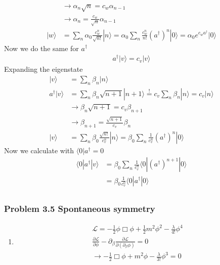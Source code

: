 \documentclass[10pt,a4paper]{article}
\theoremstyle{definition}
\begin{document}
\begin{enumerate}
\begin{align}
    &\rightarrow\alpha_n\sqrt{n}=c_w\alpha_{n-1}\\
    &\rightarrow\alpha_n=\frac{c_w}{\sqrt{n}}\alpha_{n-1}\\
    |w\rangle
    &=\sum_n\alpha_0\frac{c_w^n}{\sqrt{n!}}|n\rangle
    =\alpha_0\sum_n\frac{c_w^n}{n!}(a^\dagger)^n|0\rangle
    =\alpha_0 e^{c_wa^\dagger}|0\rangle
\end{align}
Now we do the same for $a^\dagger$
\begin{align}
    a^\dagger|v\rangle=c_v|v\rangle
\end{align}
Expanding the eigenstate 
\begin{align}
    |v\rangle
    &=\sum_n\beta_n|n\rangle\\
    a^\dagger|v\rangle
    &=\sum_n\beta_n\sqrt{n+1}|n+1\rangle\overset{!}{=}c_v\sum_n\beta_n|n\rangle=c_v|n\rangle\\
    &\rightarrow\beta_{n}\sqrt{n+1}=c_v\beta_{n+1}\\
    &\rightarrow\beta_{n+1}=\frac{\sqrt{n+1}}{c_v}\beta_{n}\\
    |v\rangle
    &=\sum_n\beta_0\frac{\sqrt{n!}}{c_v^n}|n\rangle=\beta_0\sum_n\frac{1}{c_v^n}(a^\dagger)^n|0\rangle
\end{align}
Now we calculate with $\langle 0|a^\dagger=0$
\begin{align}
    \langle 0|a^\dagger|v\rangle&=\beta_0\sum_n\frac{1}{c_v^n}\langle 0|(a^\dagger)^{n+1}|0\rangle\\
    &=\beta_0\frac{1}{c_v^0}\langle 0|a^\dagger|0\rangle\\
\end{align}
\end{enumerate}

\subsubsection{Problem 3.5 Spontaneous symmetry}
\begin{enumerate}
    \item 
    \begin{align}
    \mathscr{L}=-\frac{1}{2}\phi\Box\phi+\frac{1}{2}m^2\phi^2-\frac{\lambda}{4!}\phi^4\\
    \frac{\partial\mathscr{L}}{\partial \phi}-\partial_\beta\frac{\partial\mathscr{L}}{\partial(\partial_\beta \phi)}=0\\
    \rightarrow -\frac{1}{2}\Box\phi+m^2\phi-\frac{\lambda}{3!}\phi^3=0
\end{align}
\end{enumerate}
\end{document}
